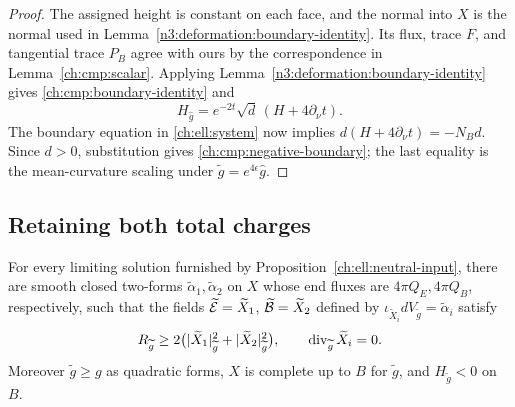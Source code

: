 \begin{proof}
The assigned height is constant on each face, and the normal into $X$
is the normal used in Lemma~\ref{n3:deformation:boundary-identity}.
Its flux, trace $F$, and tangential trace $P_B$ agree with ours by the
correspondence in Lemma~\ref{ch:cmp:scalar}. Applying
Lemma~\ref{n3:deformation:boundary-identity} gives
\eqref{ch:cmp:boundary-identity} and
\[
 H_{\hat g}=e^{-2t}\sqrt d\,(H+4\partial_\nu t).
\]
The boundary equation in \eqref{ch:ell:system} now implies
$d(H+4\partial_\nu t)=-N_Bd$. Since $d>0$, substitution gives
\eqref{ch:cmp:negative-boundary}; the last equality is the
mean-curvature scaling under $\widetilde g=e^{4\epsilon}\hat g$.
\end{proof}

\subsection{Retaining both total charges}

\begin{proposition}\label{ch:cmp:charged-comparison}
For every limiting solution furnished by Proposition~\ref{ch:ell:neutral-input}, there are
smooth closed two-forms $\widetilde\alpha_1,\widetilde\alpha_2$ on $X$
whose end fluxes are $4\pi Q_E,4\pi Q_B$, respectively, such that the
fields $\widetilde{\mathcal E}=\widetilde X_1$, $\widetilde{\mathcal B}=\widetilde X_2$ defined by
$\iota_{\widetilde X_i}dV_{\widetilde g}=\widetilde\alpha_i$ satisfy
\begin{equation}\label{ch:cmp:charged-scalar}
 R_{\widetilde g}\ge
       2\bigl(|\widetilde X_1|_{\widetilde g}^2
                         +|\widetilde X_2|_{\widetilde g}^2\bigr),
 \qquad \operatorname{div}_{\widetilde g}\widetilde X_i=0.
\end{equation}
Moreover $\widetilde g\ge g$ as quadratic forms, $X$ is complete up to
$B$ for $\widetilde g$, and $H_{\widetilde g}<0$ on $B$.
\end{proposition}

